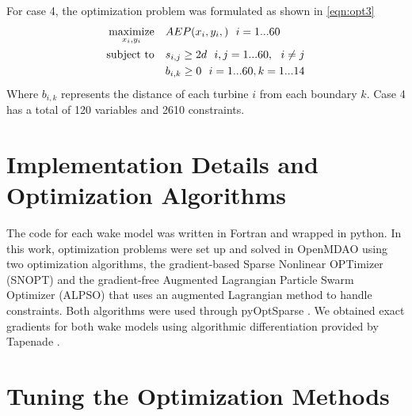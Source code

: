 \documentclass{jpconf}
\begin{document}
%
For case 4, the optimization problem was formulated as shown in \cref{eqn:opt3}
%
\begin{equation}
\label{eqn:opt3}
\begin{aligned} [b]
\underset{x_i,y_i}{\textrm{maximize}} \quad & AEP(x_i,y_i,)~~i=1...60\\
\textrm{subject to} \quad & s_{i,j} \geq 2\*d~~i,j=1...60,~~i \neq j\\
& b_{i,k} \geq 0 ~~ i=1...60, k=1...14
\end{aligned}
\end{equation}
%
Where $b_{i,k}$ represents the distance of each turbine $i$ from each boundary $k$. Case 4 has a total of 120 variables and 2610 constraints.

\section{Implementation Details and Optimization Algorithms}
The code for each wake model was written in Fortran and wrapped in python. In this work, optimization problems were set up and solved in OpenMDAO \cite{gray2010_OpenMDAO} using two optimization algorithms, the gradient-based Sparse Nonlinear OPTimizer (SNOPT)  \cite{gill2005} and the gradient-free Augmented Lagrangian Particle Swarm Optimizer (ALPSO) \cite{jansen2011_alpso} that uses an augmented Lagrangian method to handle constraints. Both algorithms were used through pyOptSparse \cite{perez2012a}. We obtained exact gradients for both wake models using algorithmic differentiation provided by Tapenade \cite{tapenade2013}.

\section{Tuning the Optimization Methods}\label{sec:tuning}
\end{document}
